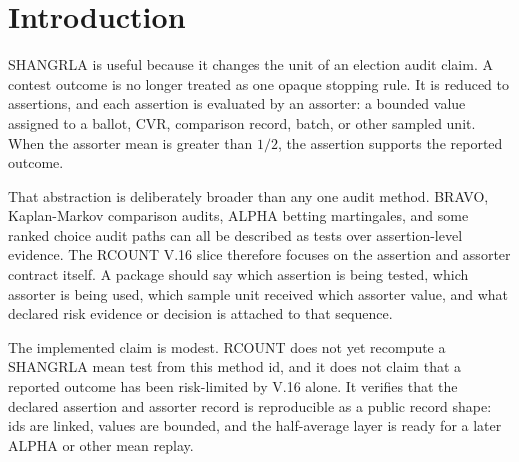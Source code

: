 \section{Introduction}

SHANGRLA is useful because it changes the unit of an election audit claim. A
contest outcome is no longer treated as one opaque stopping rule. It is reduced
to assertions, and each assertion is evaluated by an assorter: a bounded value
assigned to a ballot, CVR, comparison record, batch, or other sampled unit. When
the assorter mean is greater than $1/2$, the assertion supports the reported
outcome.

That abstraction is deliberately broader than any one audit method. BRAVO,
Kaplan-Markov comparison audits, ALPHA betting martingales, and some ranked
choice audit paths can all be described as tests over assertion-level evidence.
The RCOUNT V.16 slice therefore focuses on the assertion and assorter contract
itself. A package should say which assertion is being tested, which assorter is
being used, which sample unit received which assorter value, and what declared
risk evidence or decision is attached to that sequence.

The implemented claim is modest. RCOUNT does not yet recompute a SHANGRLA mean
test from this method id, and it does not claim that a reported outcome has been
risk-limited by V.16 alone. It verifies that the declared assertion and assorter
record is reproducible as a public record shape: ids are linked, values are
bounded, and the half-average layer is ready for a later ALPHA or other mean
replay.
